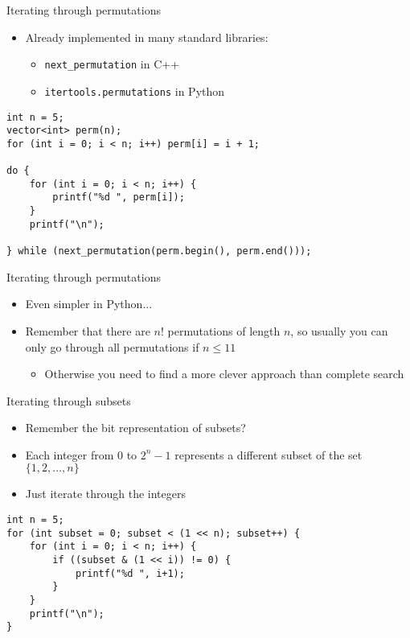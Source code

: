 \documentclass[12pt,t]{beamer}
\newcommand{\bi}{\begin{itemize}}
\newcommand{\ei}{\end{itemize}}
\begin{document}
\begin{frame}[fragile]{Iterating through permutations}
    \bi
        \item Already implemented in many standard libraries:
            \bi
                \item \texttt{next\_{}permutation} in C++
                \item \texttt{itertools.permutations} in Python
            \ei
    \ei

            \begin{verbatim}
int n = 5;
vector<int> perm(n);
for (int i = 0; i < n; i++) perm[i] = i + 1;

do {
    for (int i = 0; i < n; i++) {
        printf("%d ", perm[i]);
    }
    printf("\n");

} while (next_permutation(perm.begin(), perm.end()));
            \end{verbatim}

\end{frame}

\begin{frame}{Iterating through permutations}
    \vspace{40pt}

    \bi
        \item Even simpler in Python...
        \vspace{20pt}
        \item Remember that there are $n!$ permutations of length $n$, so usually you can only go through all permutations if $n \leq 11$
            \bi
                \item Otherwise you need to find a more clever approach than complete search
            \ei
            \vspace{20pt}
    \ei
\end{frame}


\begin{frame}[fragile]{Iterating through subsets}
    \bi
        \item Remember the bit representation of subsets?
        \item Each integer from $0$ to $2^n - 1$ represents a different subset of the set $\{1,2,\ldots,n\}$
        \item Just iterate through the integers
    \ei

            \begin{verbatim}
int n = 5;
for (int subset = 0; subset < (1 << n); subset++) {
    for (int i = 0; i < n; i++) {
        if ((subset & (1 << i)) != 0) {
            printf("%d ", i+1);
        }
    }
    printf("\n");
}
            \end{verbatim}
\end{frame}
\end{document}
